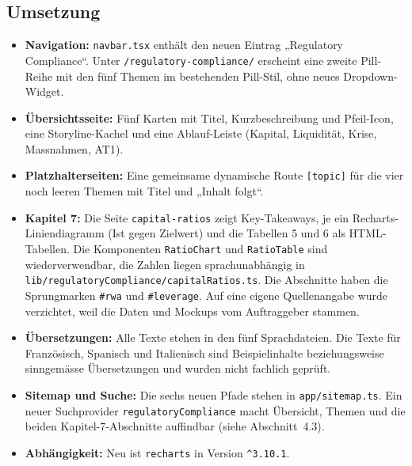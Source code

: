 \documentclass[11pt,a4paper]{article}
\let\oldsubsection\subsection
\renewcommand{\subsection}{\needspace{6\baselineskip}\oldsubsection}
\begin{document}
\subsection{Umsetzung}
\begin{itemize}[nosep]
  \item \textbf{Navigation:} \texttt{navbar.tsx} enthält den neuen Eintrag „Regulatory Compliance“. Unter \texttt{/regulatory-compliance/\allowbreak *} erscheint eine zweite Pill-Reihe mit den fünf Themen im bestehenden Pill-Stil, ohne neues Dropdown-Widget.
  \item \textbf{Übersichtsseite:} Fünf Karten mit Titel, Kurzbeschreibung und Pfeil-Icon, eine Storyline-Kachel und eine Ablauf-Leiste (Kapital, Liquidität, Krise, Massnahmen, AT1).
  \item \textbf{Platzhalterseiten:} Eine gemeinsame dynamische Route \texttt{[topic]} für die vier noch leeren Themen mit Titel und „Inhalt folgt“.
  \item \textbf{Kapitel 7:} Die Seite \texttt{capital-ratios} zeigt Key-Takeaways, je ein Recharts-Liniendiagramm (Ist gegen Zielwert) und die Tabellen 5 und 6 als HTML-Tabellen. Die Komponenten \texttt{RatioChart} und \texttt{RatioTable} sind wiederverwendbar, die Zahlen liegen sprachunabhängig in \texttt{lib/regulatoryCompliance/capitalRatios.ts}. Die Abschnitte haben die Sprungmarken \texttt{\#rwa} und \texttt{\#leverage}. Auf eine eigene Quellenangabe wurde verzichtet, weil die Daten und Mockups vom Auftraggeber stammen.
  \item \textbf{Übersetzungen:} Alle Texte stehen in den fünf Sprachdateien. Die Texte für Französisch, Spanisch und Italienisch sind Beispielinhalte beziehungsweise sinngemässe Übersetzungen und wurden nicht fachlich geprüft.
  \item \textbf{Sitemap und Suche:} Die sechs neuen Pfade stehen in \texttt{app/sitemap.ts}. Ein neuer Suchprovider \texttt{regulatoryCompliance} macht Übersicht, Themen und die beiden Kapitel-7-Abschnitte auffindbar (siehe Abschnitt~4.3).
  \item \textbf{Abhängigkeit:} Neu ist \texttt{recharts} in Version \texttt{\^{}3.10.1}.
\end{itemize}
\end{document}
